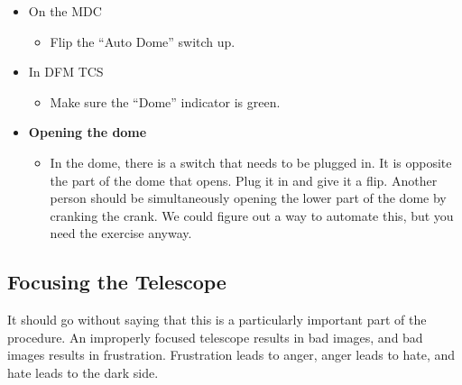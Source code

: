 \documentclass[letterpaper, 12pt]{report}
\begin{document}
\begin{itemize}
\begin{itemize}
\begin{itemize}
\begin{itemize}
						\end{itemize}
					\end{itemize}
					\begin{itemize}
						\item On the MDC
						\begin{itemize}
							\item Flip the ``Auto Dome'' switch up.
						\end{itemize}
					\end{itemize}
					\begin{itemize}
						\item In DFM TCS
						\begin{itemize}
							\item Make sure the ``Dome'' indicator is green.
						\end{itemize}
					\end{itemize}
				\end{itemize}
	\end{itemize}
\begin{itemize}
	\item \large \textbf{Opening the dome}
	\begin{itemize}
		\item In the dome, there is a switch that needs to be plugged in. It is opposite the part of the dome that opens. Plug it in and give it a flip. Another person should be simultaneously opening the lower part of the dome by cranking the crank. We could figure out a way to automate this, but you need the exercise anyway.
	\end{itemize}
\end{itemize}
\subsection{Focusing the Telescope}
It should go without saying that this is a particularly important part of the procedure. An improperly focused telescope results in bad images, and bad images results in frustration. Frustration leads to anger, anger leads to hate, and hate leads to the dark side.
\end{document}
